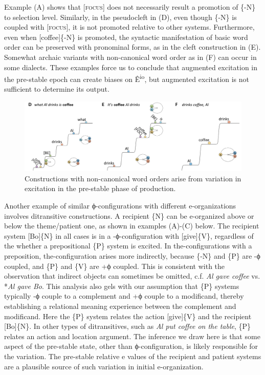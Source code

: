   Example {}(A) shows that [\textsc{focus}] does not necessarily result a promotion of \{-N\} to selection level. Similarly, in the pseudocleft in (D), even though \{-N\} is coupled with [\textsc{focus}], it is not promoted relative to other systems. Furthermore, even when [coffee]\{-N\} is promoted, the syntactic manifestation of basic word order can be preserved with pronominal forms, as in the cleft construction in {}(E). Somewhat archaic variants with non-canonical word order as in (F) can occur in some dialects. These examples force us to conclude that augmented excitation in the pre-stable epoch can create biases on Ê\textsuperscript{io}, but augmented excitation is not sufficient to determine its output. 

  
\begin{figure}
\includegraphics[width=\textwidth]{figures/Tilsen-img79.png}
\caption{Constructions with non-canonical word orders arise from variation in excitation in the pre-stable phase of production.}
\label{fig:4:29}
\end{figure}
 

  Another example of similar ϕ-configurations with different e-organizations involves ditransitive constructions. A recipient \{N\} can be e-organized above or below the theme/patient one, as shown in examples (A)-(C) below. The recipient system [Bo]\{N\} in all cases is in a -ϕ-configuration with [give]\{V\}, regardless of the whether a prepositional \{P\} system is excited. In the-configurations with a preposition, the-configuration arises more indirectly, because \{-N\} and \{P\} are -ϕ coupled, and \{P\} and \{V\} are +ϕ coupled. This is consistent with the observation that indirect objects can sometimes be omitted, c.f. \textit{Al gave coffee} vs. *\textit{Al gave Bo}. This analysis also gels with our assumption that \{P\} systems typically -ϕ couple to a complement and +ϕ couple to a modificand, thereby establishing a relational meaning experience between the complement and modificand. Here the \{P\} system relates the action [give]\{V\} and the recipient [Bo]\{N\}. In other types of ditransitives, such as \textit{Al put coffee on the table}, \{P\} relates an action and location argument. The inference we draw here is that some aspect of the pre-stable state, other than ϕ-configuration, is likely responsible for the variation. The pre-stable relative e values of the recipient and patient systems are a plausible source of such variation in initial e-organization.

